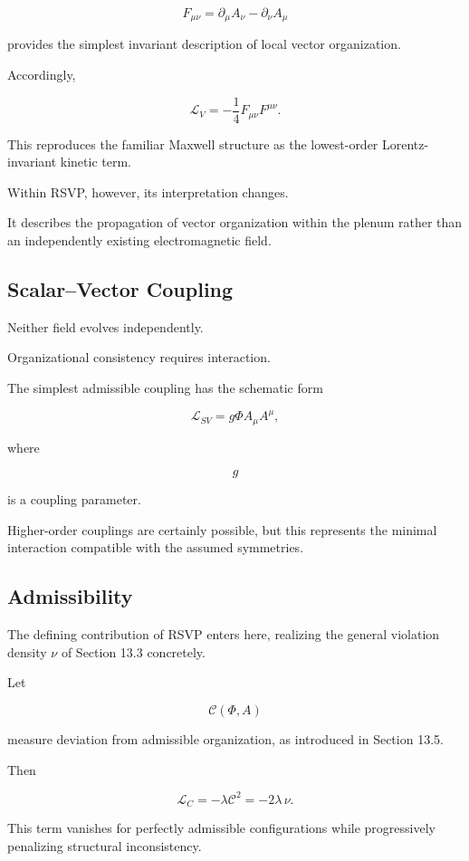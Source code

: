 \documentclass[11pt,oneside]{book}
\numberwithin{equation}{chapter}
\theoremstyle{definition}
\theoremstyle{plain}
\begin{document}
\[
F_{\mu\nu}
=
\partial_\mu A_\nu
-
\partial_\nu A_\mu
\]

provides the simplest invariant description of local vector organization.

Accordingly,

\[
\mathcal L_V
=
-
\frac14
F_{\mu\nu}
F^{\mu\nu}.
\]

This reproduces the familiar Maxwell structure as the lowest-order
Lorentz-invariant kinetic term.

Within RSVP, however, its interpretation changes.

It describes the propagation of vector organization within the plenum
rather than an independently existing electromagnetic field.

\subsection*{Scalar--Vector Coupling}

Neither field evolves independently.

Organizational consistency requires interaction.

The simplest admissible coupling has the schematic form

\[
\mathcal L_{SV}
=
g
\Phi
A_\mu
A^\mu,
\]

where

\[
g
\]

is a coupling parameter.

Higher-order couplings are certainly possible, but this represents the
minimal interaction compatible with the assumed symmetries.

\subsection*{Admissibility}

The defining contribution of RSVP enters here, realizing the general
violation density \(\nu\) of Section 13.3 concretely.

Let

\[
\mathcal C(\Phi,A)
\]

measure deviation from admissible organization, as introduced in Section
13.5.

Then

\[
\mathcal L_C
=
-
\lambda
\mathcal C^2
=
-2\lambda\,\nu.
\]

This term vanishes for perfectly admissible configurations while
progressively penalizing structural inconsistency.
\end{document}
